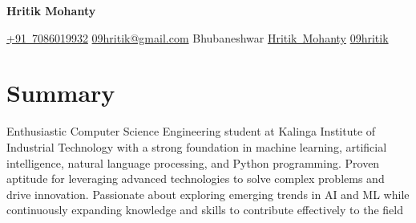 \documentclass[10pt, letterpaper]{article}
\newenvironment{header}{
        \setlength{\topsep}{0pt}\par\kern\topsep\centering\color{primaryColor}\linespread{1.5}
    }{
        \par\kern\topsep
    } %
\newcommand{\placelastupdatedtext}{%
  \AddToShipoutPictureFG*{%
    \put(
        \LenToUnit{\paperwidth-2 cm-0.2 cm+0.05cm},
        \LenToUnit{\paperheight-1.0 cm}
    ){\vtop{{\null}\makebox[0pt][c]{
        
    }}}%
  }%
}%
\let\hrefWithoutArrow\href
\renewcommand{\href}[2]{\hrefWithoutArrow{#1}{\mbox{\ifthenelse{\equal{#2}{}}{ }{#2 }\raisebox{.15ex}{\footnotesize \faExternalLink*}}}}
\begin{document}
    \placelastupdatedtext
    \begin{header}
        \fontsize{30 pt}{30 pt}
        \textbf{Hritik Mohanty}

        \vspace{0.3 cm}

        \normalsize
        \mbox{\hrefWithoutArrow{tel:+7086019932}{{\footnotesize\faPhone*}\hspace*{0.13cm}+91 7086019932}}
        \hspace*{0.5 cm}
        \mbox{\hrefWithoutArrow{mailto:09hritik@gmail.com.com}{{\small\faEnvelope[regular]}\hspace*{0.13cm}09hritik@gmail.com}}
        \hspace*{0.5 cm}
        \mbox{{\small\faMapMarker*}\hspace*{0.13cm}Bhubaneshwar}
        \hspace*{0.5 cm}
        \hspace*{0.5 cm}
        \mbox{\hrefWithoutArrow{https://linkedin.com/in/hritik-mohanty}{{\small\faLinkedinIn}\hspace*{0.13cm}Hritik Mohanty}}
        \hspace*{0.5 cm}
        \mbox{\hrefWithoutArrow{https://github.com/09hritik}{{\small\faGithub}\hspace*{0.13cm}09hritik}}
        \hspace*{0.5 cm}
    \end{header}

    \vspace{0.3 cm}


    \section{Summary}

        \begin{changemargin}{0.2 cm}{0.2 cm}
Enthusiastic Computer Science Engineering student at Kalinga Institute of Industrial Technology with a strong foundation in machine learning, artificial intelligence, natural language processing, and Python programming. Proven aptitude for leveraging advanced technologies to solve complex problems and drive innovation. Passionate about exploring emerging trends in AI and ML while continuously expanding knowledge and skills to contribute effectively to the field
        \end{changemargin}
\end{document}
